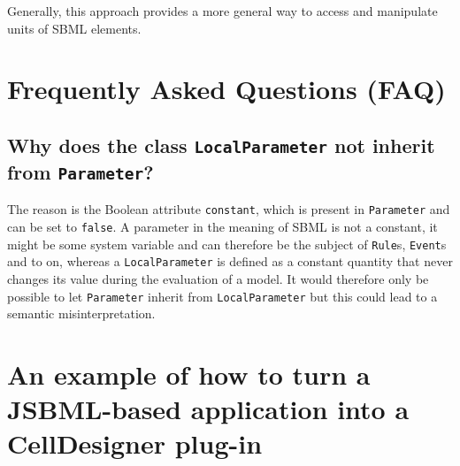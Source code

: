 \documentclass[
  BCOR12mm,
  letterpaper,
  11pt,
  headsepline,
  pointlessnumbers,
  tablecaptionabove,
  headinclude,
  appendixprefix,
  idxtotoc,
  bibtotoc,
  twoside,
  titlepage
]{scrartcl}
\begin{document}
Generally, this approach provides a more general way to access and manipulate
units of SBML elements.

\appendix

\section{Frequently Asked Questions (FAQ)}


\subsection{Why does the class \texttt{LocalParameter} not inherit from
\texttt{Parameter}?}

The reason is the Boolean attribute \texttt{constant}, which is present in
\texttt{Parameter} and can be set to \texttt{false}. A parameter in the meaning
of SBML is not a constant, it might be some system variable and can therefore
be the subject of \texttt{Rule}s, \texttt{Event}s and to on, whereas a
\texttt{LocalParameter} is defined as a constant quantity that never changes its
value during the evaluation of a model. It would therefore only be possible to
let \texttt{Parameter} inherit from \texttt{LocalParameter} but this could lead
to a semantic misinterpretation.


\section{An example of how to turn a JSBML-based application into a CellDesigner
plug-in}
\end{document}
